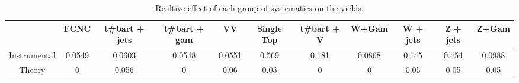\begin{table}[htbp]
\begin{center}
\begin{tabular}{|c|c|c|c|c|c|c|c|c|c|c|}
\hline 
      & FCNC      & t#bar{t} + jets      & t#bar{t} +  gam      & VV      & Single Top      & t#bar{t} + V      & W+Gam      & W + jets      & Z + jets      & Z+Gam \\ 
\hline 
 Instrumental & 0.0549 & 0.0603 & 0.0548 & 0.0551 & 0.569 & 0.181 & 0.0868 & 0.145 & 0.454 & 0.0988 \\ 
 Theory & 0 & 0.056 & 0 & 0.06 & 0.05 & 0 & 0 & 0.05 & 0.05 & 0.05 \\ 
\hline 
\end{tabular} 
\caption{Realtive effect of each group of systematics on the yields.} 
\end{center} 
\end{table} 

